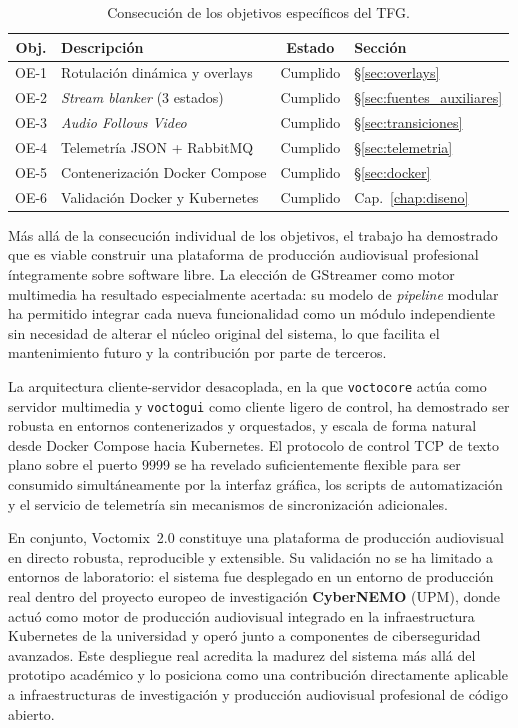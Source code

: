 \begin{table}[H]
  \centering
  \caption{Consecución de los objetivos específicos del TFG.}
  \label{tab:objetivos_cumplidos}
  \begin{tabular}{|c|l|c|l|}
    \hline
    \textbf{Obj.} & \textbf{Descripción} & \textbf{Estado} & \textbf{Sección} \\
    \hline
    OE-1 & Rotulación dinámica y overlays   & Cumplido & \S\ref{sec:overlays} \\
    OE-2 & \textit{Stream blanker} (3 estados) & Cumplido & \S\ref{sec:fuentes_auxiliares} \\
    OE-3 & \textit{Audio Follows Video}     & Cumplido & \S\ref{sec:transiciones} \\
    OE-4 & Telemetría JSON + RabbitMQ       & Cumplido & \S\ref{sec:telemetria} \\
    OE-5 & Contenerización Docker Compose   & Cumplido & \S\ref{sec:docker} \\
    OE-6 & Validación Docker y Kubernetes     & Cumplido & Cap.~\ref{chap:diseno} \\
    \hline
  \end{tabular}
\end{table}

\vspace{0.3cm}

Más allá de la consecución individual de los objetivos, el trabajo ha demostrado que
es viable construir una plataforma de producción audiovisual profesional íntegramente
sobre software libre. La elección de GStreamer como motor multimedia ha resultado
especialmente acertada: su modelo de \textit{pipeline} modular ha permitido integrar
cada nueva funcionalidad como un módulo independiente sin necesidad de alterar el
núcleo original del sistema, lo que facilita el mantenimiento futuro y la contribución
por parte de terceros.

La arquitectura cliente-servidor desacoplada, en la que \texttt{voctocore} actúa como
servidor multimedia y \texttt{voctogui} como cliente ligero de control, ha demostrado
ser robusta en entornos contenerizados y orquestados, y escala de forma natural
desde Docker Compose hacia Kubernetes. El protocolo de control TCP de texto
plano sobre el puerto 9999 se ha revelado suficientemente flexible para ser consumido
simultáneamente por la interfaz gráfica, los scripts de automatización y el servicio
de telemetría sin mecanismos de sincronización adicionales.

En conjunto, Voctomix~2.0 constituye una plataforma de producción audiovisual en
directo robusta, reproducible y extensible. Su validación no se ha limitado a entornos
de laboratorio: el sistema fue desplegado en un entorno de producción real dentro del
proyecto europeo de investigación \textbf{CyberNEMO} (UPM), donde actuó como motor de
producción audiovisual integrado en la infraestructura Kubernetes de la universidad y
operó junto a componentes de ciberseguridad avanzados. Este despliegue real acredita
la madurez del sistema más allá del prototipo académico y lo posiciona como una
contribución directamente aplicable a infraestructuras de investigación y producción
audiovisual profesional de código abierto.
